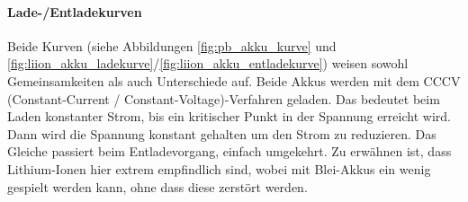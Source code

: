 \paragraph{Lade-/Entladekurven}

Beide Kurven (siehe Abbildungen \ref{fig:pb_akku_kurve} und \ref{fig:liion_akku_ladekurve}/\ref{fig:liion_akku_entladekurve}) weisen sowohl Gemeinsamkeiten als auch Unterschiede auf. Beide Akkus werden mit dem CCCV (Constant-Current / Constant-Voltage)-Verfahren  geladen. Das bedeutet beim Laden konstanter Strom, bis ein kritischer Punkt in der Spannung erreicht wird. Dann wird die Spannung konstant gehalten um den Strom zu reduzieren. Das Gleiche passiert beim Entladevorgang, einfach umgekehrt. Zu erwähnen ist, dass Lithium-Ionen hier extrem empfindlich sind, wobei mit Blei-Akkus ein wenig gespielt werden kann, ohne dass diese zerstört werden.

\newpage

